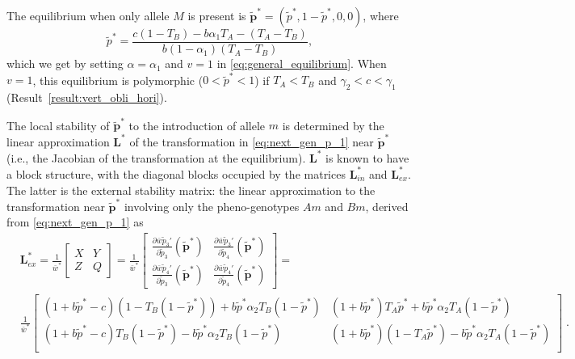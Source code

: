 \documentclass[12pt]{extarticle}
\let\vec\mathbf
\begin{document}
\begin{appendices}
The equilibrium when only allele $M$ is present is  $\vec{\tilde{p}^*} = (\tilde{p}^*, 1-\tilde{p}^*, 0, 0)$, where
\begin{equation} \label{eq:p_tilde_star_alpha_1}
\tilde{p}^*=
\frac{c(1-T_B) - b \alpha_1 T_A - (T_A - T_B)}{b(1-\alpha_1)(T_A-T_B)},
\end{equation}
which we get by setting $\alpha=\alpha_1$ and $v=1$ in \autoref{eq:general_equilibrium}.
When $v=1$, this equilibrium is polymorphic ($0 < \tilde{p}^* < 1$) if $T_A<T_B$ and $\gamma_2<c<\gamma_1$ (Result~\autoref{result:vert_obli_hori}).

The local stability of $\vec{\tilde{p}^*}$ to the introduction of allele $m$ is determined by the linear approximation $\vec{L}^*$ of the transformation in \autoref{eq:next_gen_p_1} near $\vec{\tilde{p}^*}$ (i.e., the Jacobian of the transformation at the equilibrium).
$\vec{L}^*$ is known to have a block structure, with the diagonal blocks occupied by the matrices $\vec{L}^*_{in}$ and $\vec{L}^*_{ex}$.
The latter is the external stability matrix: the linear approximation to the transformation near $\vec{\tilde{p}^*}$ involving only the pheno-genotypes $Am$ and $Bm$, derived from \autoref{eq:next_gen_p_1} as
\begin{equation} \label{eq:external_stability_matrix}
\begin{aligned}
&\mathbf{L}^*_{ex} = 
 \frac{1}{\bar{w}^*} \begin{bmatrix}
	 X &
	 Y \\
	 Z &
	 Q 
\end{bmatrix} = 
\frac{1}{\bar{w}^*} \begin{bmatrix}
\frac{\partial\bar{w}\tilde{p}_3'}{\partial \tilde{p}_3}(\vec{\tilde{p}}^*) &
\frac{\partial\bar{w}\tilde{p}_3'}{\partial \tilde{p}_4}(\vec{\tilde{p}}^*) \\
\frac{\partial\bar{w}\tilde{p}_4'}{\partial \tilde{p}_3}(\vec{\tilde{p}}^*) &
\frac{\partial\bar{w}\tilde{p}_4'}{\partial \tilde{p}_4}(\vec{\tilde{p}}^*) 
\end{bmatrix} = \\
& \frac{1}{\bar{w}^*} \begin{bmatrix}
		(1+b \tilde{p}^* -c)(1-T_B(1-\tilde{p}^*)) + b \tilde{p}^* \alpha_2 T_B (1-\tilde{p}^*) & 
		(1+b \tilde{p}^*) T_A \tilde{p}^* + b \tilde{p}^* \alpha_2 T_A(1-\tilde{p}^*) \\
		(1+b \tilde{p}^* - c) T_B(1-\tilde{p}^*) - b \tilde{p}^* \alpha_2 T_B (1-\tilde{p}^*) &
		(1+b \tilde{p}^*) (1-T_A \tilde{p}^*) - b \tilde{p}^* \alpha_2 T_A (1-\tilde{p}^*) \\
  	\end{bmatrix} \;.
\end{aligned}
\end{equation}


\end{appendices}
\end{document}
